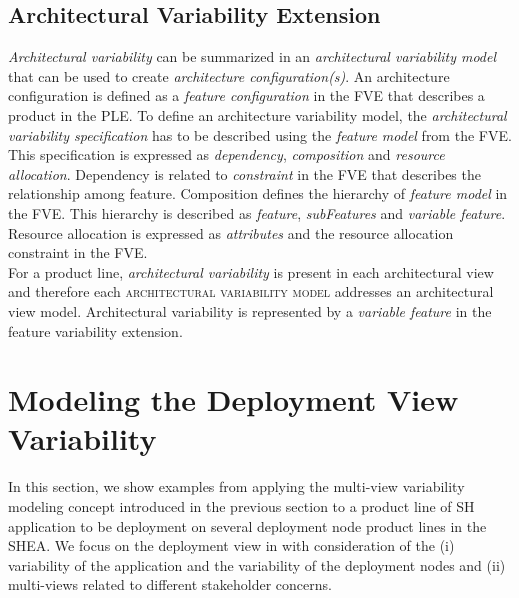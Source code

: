 \documentclass{llncs}
\begin{document}
\subsection{Architectural Variability Extension}
\emph{Architectural variability} can be summarized in an \emph{architectural variability model} that can be used to create \emph{architecture configuration(s)}. An architecture configuration is defined as a \emph{feature configuration} in the FVE that describes a product in the PLE. To define an architecture variability model, the \emph{architectural variability specification} has to be described using the \emph{feature model} from the FVE. This specification is expressed as \emph{dependency}, \emph{composition} and \emph{resource allocation}. Dependency is related to \emph{constraint} in the FVE that describes the relationship among feature. Composition defines the hierarchy of \emph{feature model} in the FVE. This hierarchy is described as \emph{feature}, \emph{subFeatures} and \emph{variable feature}. Resource allocation is expressed as \emph{attributes} and the resource allocation constraint in the FVE.  \\
For a product line, \emph{architectural variability} is present in each architectural view and therefore each \textsc{architectural variability model} addresses an architectural view model. Architectural variability is represented by a \emph{variable feature} in the feature variability extension.\\
\section{Modeling the Deployment View Variability}
 \label{sec3}
In this section, we show examples from applying the multi-view
variability modeling concept introduced in the previous section to a product line of SH application to be deployment on several deployment node product lines in the SHEA. We focus on the deployment view in with consideration of the (i) variability of the application and the variability of the deployment nodes and (ii) multi-views related to different stakeholder concerns.
\end{document}
